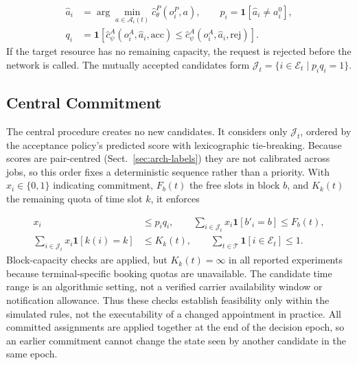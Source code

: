 \documentclass[a4paper]{llncs}
\begin{document}
\begin{equation}
\begin{aligned}
\hat a_i&=\arg\min_{a\in\mathcal A_i(t)}
\hat c_{\theta}^{P}(o_i^P,a),\qquad
p_i=\mathbf 1[\hat a_i\ne a_i^0],\\
q_i&=\mathbf 1\!\left[
\hat c_{\psi}^{A}(o_i^A,\hat a_i,\mathrm{acc})
\le
\hat c_{\psi}^{A}(o_i^A,\hat a_i,\mathrm{rej})
\right].
\end{aligned}
\end{equation}
If the target resource has no remaining capacity, the request is
rejected before the network is called. The mutually accepted candidates
form $\mathcal J_t=\{i\in\mathcal E_t\mid p_iq_i=1\}$.

\subsection{Central Commitment}
\label{sec:arch-commit}
The central procedure creates no new candidates. It considers only
$\mathcal J_t$, ordered by the acceptance policy's predicted score with
lexicographic tie-breaking. Because scores are pair-centred
(Sect.~\ref{sec:arch-labels}) they are not calibrated across jobs, so this
order fixes a deterministic sequence rather than a priority. With $x_i\in\{0,1\}$ indicating commitment,
$F_b(t)$ the free slots in block $b$, and $K_k(t)$ the remaining quota
of time slot $k$, it enforces

\begin{equation}
\begin{aligned}
x_i&\le p_iq_i,\qquad
\sum_{i\in\mathcal J_t}\!x_i\mathbf1[b'_i\!=\!b]\le F_b(t),\\
\sum_{i\in\mathcal J_t}\!x_i\mathbf1[k(i)\!=\!k]&\le K_k(t),\qquad
\sum_{t\in\mathcal T}\!\mathbf1[i\in\mathcal E_t]\le1.
\end{aligned}
\end{equation}
Block-capacity checks are applied, but $K_k(t)=\infty$ in all reported
experiments because terminal-specific booking quotas are unavailable.
The candidate time range is an algorithmic setting, not a verified
carrier availability window or notification allowance. Thus these
checks establish feasibility only within the simulated rules, not
the executability of a changed appointment in practice. All committed assignments are applied together at the end of
the decision epoch, so an earlier commitment cannot change the state
seen by another candidate in the same epoch.
\end{document}
